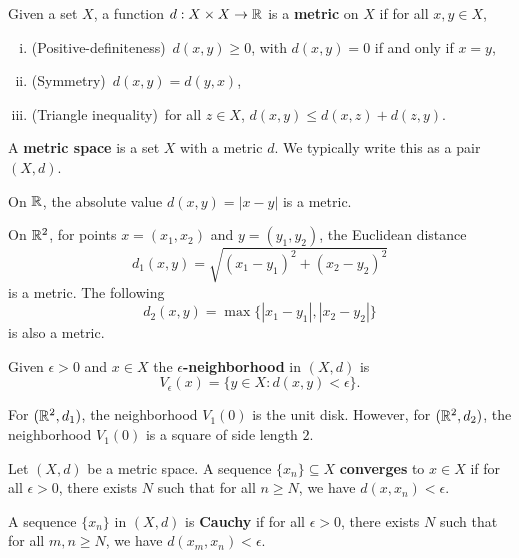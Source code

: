 \begin{definition}
  Given a set $X$, a function $d : X \times X \to \mathbb{R}$ is a
  \textbf{metric} on $X$ if for all $x, y \in X$,
  \begin{enumerate}[(i)]
    \item (Positive-definiteness)\ $d(x, y) \ge 0$, with $d(x, y) = 0$ if and only
      if $x = y$,
    \item (Symmetry)\ $d(x, y) = d(y, x)$,
    \item (Triangle inequality)\ for all $z \in X$,
      $d(x, y) \le d(x, z) + d(z, y)$.
  \end{enumerate}
  A \textbf{metric space} is a set $X$ with a metric $d$.
  We typically write this as a pair $(X, d)$.
\end{definition}

\begin{example}
  On $\mathbb{R}$, the absolute value $d(x, y) = |x - y|$ is a metric.
\end{example}

\begin{example}
  On $\mathbb{R}^2$, for points $x = (x_1, x_2)$ and $y = (y_1, y_2)$,
  the Euclidean distance
  \[d_1 (x, y) = \sqrt{(x_1 - y_1)^2 + (x_2 - y_2)^2}\]
  is a metric. The following
  \[
    d_2(x, y) = \max\{|x_1 - y_1|, |x_2 - y_2|\}
  \]
  is also a metric.
\end{example}

\begin{definition}
  Given $\epsilon > 0$ and $x \in X$ the
  \textbf{$\epsilon$-neighborhood} in $(X, d)$ is
  \[V_\epsilon(x) = \{y \in X : d(x, y) < \epsilon\}.\]
\end{definition}

\begin{example}
  For $(\mathbb{R}^2, d_1)$, the neighborhood
  $V_1(0)$ is the unit disk. However, for
  $(\mathbb{R}^2, d_2)$, the neighborhood $V_1(0)$ is a square of
  side length $2$.
\end{example}

\begin{definition}
  Let $(X, d)$ be a metric space. A sequence
  $\{x_n\} \subseteq X$ \textbf{converges} to
  $x \in X$ if for all
  $\epsilon > 0$, there exists $N$ such that for all
  $n \ge N$, we have $d(x, x_n) < \epsilon$.
\end{definition}

\begin{definition}
  A sequence $\{x_n\}$ in $(X, d)$ is \textbf{Cauchy} if
  for all $\epsilon > 0$, there exists $N$ such that
  for all $m, n \ge N$, we have $d(x_m, x_n) < \epsilon$.
\end{definition}

